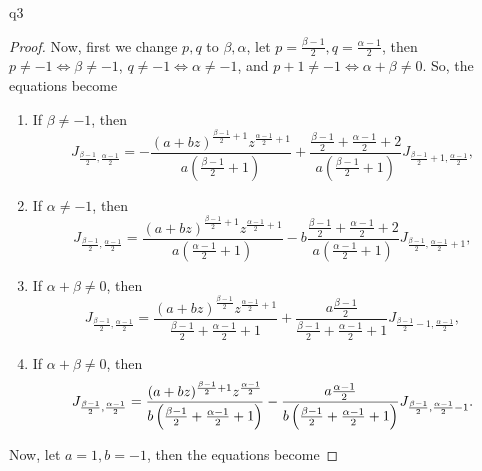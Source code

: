 \documentclass[reqno]{alittlebear}
\begin{document}
\begin{exercise}{}{}
\begin{question}{}{q3}
\begin{proof}
            Now, first we change $p,q$ to $\beta,\alpha$, let $p=\frac{\beta-1}{2}, q=\frac{\alpha-1}{2}$, then $p\neq-1\iff \beta\neq-1$, $q\neq-1\iff\alpha\neq-1$, and $p+1\neq-1\iff \alpha+\beta\neq0$. So, the equations become 
            \begin{enumerate}
                \item If $\beta\neq-1$, then \[J_{\frac{\beta-1}{2},\frac{\alpha-1}{2}} = -\frac{(a+bz)^{\frac{\beta-1}{2}+1}z^{\frac{\alpha-1}{2}+1}}{a(\frac{\beta-1}{2}+1)}+\frac{\frac{\beta-1}{2}+\frac{\alpha-1}{2}+2}{a(\frac{\beta-1}{2}+1)}J_{\frac{\beta-1}{2}+1,\frac{\alpha-1}{2}},\]
                \item If $\alpha\neq-1$, then \[J_{\frac{\beta-1}{2},\frac{\alpha-1}{2}}=\frac{(a+bz)^{\frac{\beta-1}{2}+1}z^{\frac{\alpha-1}{2}+1}}{a(\frac{\alpha-1}{2}+1)}-b\frac{\frac{\beta-1}{2}+\frac{\alpha-1}{2}+2}{a(\frac{\alpha-1}{2}+1)}J_{\frac{\beta-1}{2},\frac{\alpha-1}{2}+1},\]
                \item If $\alpha+\beta\neq0$, then \[J_{\frac{\beta-1}{2},\frac{\alpha-1}{2}}=\frac{(a+bz)^{\frac{\beta-1}{2}}z^{\frac{\alpha-1}{2}+1}}{\frac{\beta-1}{2}+\frac{\alpha-1}{2}+1}+\frac{a\frac{\beta-1}{2}}{\frac{\beta-1}{2}+\frac{\alpha-1}{2}+1}J_{\frac{\beta-1}{2}-1,\frac{\alpha-1}{2}},\]
                \item If $\alpha+\beta\neq0$, then \[J_{\frac{\beta-1}{2},\frac{\alpha-1}{2}}=\frac{(a+bz)^{\frac{\beta-1}{2}+1}z^{\frac{\alpha-1}{2}}}{b\left(\frac{\beta-1}{2}+\frac{\alpha-1}{2}+1\right)}-\frac{a\frac{\alpha-1}{2}}{b \left(\frac{\beta-1}{2}+\frac{\alpha-1}{2}+1\right)}J_{\frac{\beta-1}{2},\frac{\alpha-1}{2}-1}.\]
            \end{enumerate}

            \newpage

            Now, let $a=1, b=-1$, then the equations become


\end{proof}
\end{question}
\end{exercise}
\end{document}
